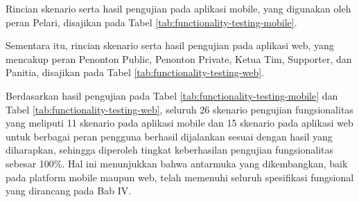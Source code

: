 Rincian skenario serta hasil pengujian pada aplikasi mobile, yang digunakan oleh peran Pelari, disajikan pada Tabel \ref{tab:functionality-testing-mobile}.



Sementara itu, rincian skenario serta hasil pengujian pada aplikasi web, yang mencakup peran Penonton Public, Penonton Private, Ketua Tim, Supporter, dan Panitia, disajikan pada Tabel \ref{tab:functionality-testing-web}.



Berdasarkan hasil pengujian pada Tabel \ref{tab:functionality-testing-mobile} dan Tabel \ref{tab:functionality-testing-web}, seluruh 26 skenario pengujian fungsionalitas yang meliputi 11 skenario pada aplikasi mobile dan 15 skenario pada aplikasi web untuk berbagai peran pengguna berhasil dijalankan sesuai dengan hasil yang diharapkan, sehingga diperoleh tingkat keberhasilan pengujian fungsionalitas sebesar 100\%. Hal ini menunjukkan bahwa antarmuka yang dikembangkan, baik pada platform mobile maupun web, telah memenuhi seluruh spesifikasi fungsional yang dirancang pada Bab IV.



% 


